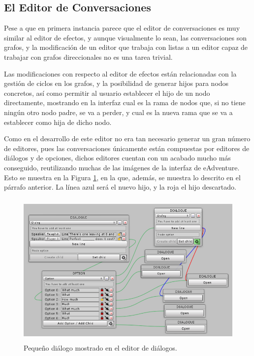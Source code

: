 \subsection{El Editor de Conversaciones}

Pese a que en primera instancia parece que el editor de conversaciones es muy similar al editor de efectos, y aunque visualmente lo sean, las conversaciones son grafos, y la modificación de un editor que trabaja con listas a un editor capaz de trabajar con grafos direccionales no es una tarea trivial. 

Las modificaciones con respecto al editor de efectos están relacionadas con la gestión de ciclos en los grafos, y la posibilidad de generar hijos para nodos concretos, así como permitir al usuario establecer el hijo de un nodo directamente, mostrando en la interfaz cual es la rama de nodos que, si no tiene ningún otro nodo padre, se va a perder, y cual es la nueva rama que se va a establecer como hija de dicho nodo.

Como en el desarrollo de este editor no era tan necesario generar un gran número de editores, pues las conversaciones únicamente están compuestas por editores de diálogos y de opciones, dichos editores cuentan con un acabado mucho más conseguido, reutilizando muchas de las imágenes de la interfaz de eAdventure. Esto se muestra en la Figura \ref{small-dialog-it3}, en la que, además, se muestra lo descrito en el párrafo anterior. La línea azul será el nuevo hijo, y la roja el hijo descartado.

\begin{figure}[h!]
	\centerline{\includegraphics[height=3in]{figures/it3/small-dialog.png}}
	\caption[Pequeño diálogo - Editor de Diálogos]{Pequeño diálogo mostrado en el editor de diálogos.}
	\label{small-dialog-it3}
\end{figure}

